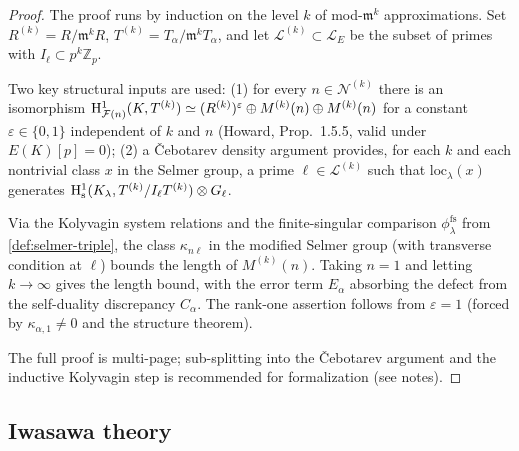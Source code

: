 \begin{proof}
  The proof runs by induction on the level \(k\) of mod-\(\mathfrak{m}^k\) approximations. Set \(R^{(k)} = R/\mathfrak{m}^k R\), \(T^{(k)} = T_\alpha/\mathfrak{m}^k T_\alpha\), and let \(\mathcal{L}^{(k)} \subset \mathcal{L}_E\) be the subset of primes with \(I_\ell \subset p^k \mathbb{Z}_p\).

  Two key structural inputs are used: (1) for every \(n \in \mathcal{N}^{(k)}\) there is an isomorphism \(\mathrm{H}^1_{\mathcal{F}(n)}(K, T^{(k)}) \simeq (R^{(k)})^\varepsilon \oplus M^{(k)}(n) \oplus M^{(k)}(n)\) for a constant \(\varepsilon \in \{0,1\}\) independent of \(k\) and \(n\) (Howard, Prop.~1.5.5, valid under \(E(K)[p] = 0\)); (2) a \v{C}ebotarev density argument provides, for each \(k\) and each nontrivial class \(x\) in the Selmer group, a prime \(\ell \in \mathcal{L}^{(k)}\) such that \(\mathrm{loc}_\lambda(x)\) generates \(\mathrm{H}^1_{\mathrm{s}}(K_\lambda, T^{(k)}/I_\ell T^{(k)}) \otimes G_\ell\).

  Via the Kolyvagin system relations and the finite-singular comparison \(\phi_\lambda^{\mathrm{fs}}\) from \cref{def:selmer-triple}, the class \(\kappa_{n\ell}\) in the modified Selmer group (with transverse condition at \(\ell\)) bounds the length of \(M^{(k)}(n)\). Taking \(n = 1\) and letting \(k \to \infty\) gives the length bound, with the error term \(E_\alpha\) absorbing the defect from the self-duality discrepancy \(C_\alpha\). The rank-one assertion follows from \(\varepsilon = 1\) (forced by \(\kappa_{\alpha,1} \neq 0\) and the structure theorem).

  The full proof is multi-page; sub-splitting into the \v{C}ebotarev argument and the inductive Kolyvagin step is recommended for formalization (see notes).
\end{proof}

\subsection{Iwasawa theory}

